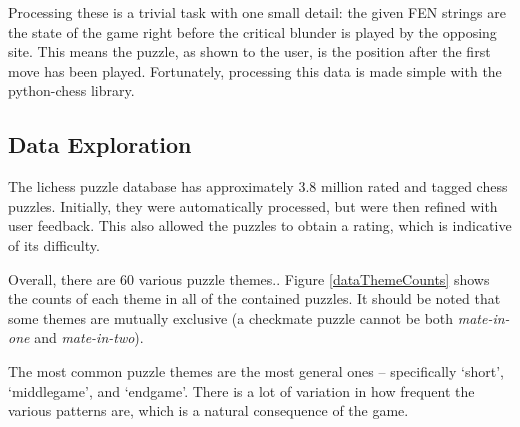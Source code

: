 Processing these is a trivial task with one small detail: the given FEN strings
are the state of the game right before the critical blunder is played by the
opposing site. This means the puzzle, as shown to the user, is the position
after the first move has been played. Fortunately, processing this data is made
simple with the python-chess library.\cite{pythonChess}

\subsection{Data Exploration}

The lichess puzzle database has approximately 3.8 million rated and tagged
chess puzzles. Initially, they were automatically
processed,\cite{lichessTagger} but were then refined with user
feedback\cite{lichessPuzzles}. This also allowed the puzzles to obtain a
rating, which is indicative of its difficulty\cite{lichessPuzzles}.

Overall, there are 60 various puzzle themes.\cite{lichessXML}. Figure
\ref{dataThemeCounts} shows the counts of each theme in all of the contained
puzzles. It should be noted that some themes are mutually exclusive (a
checkmate puzzle cannot be both \emph{mate-in-one} and \emph{mate-in-two}).

The most common puzzle themes are the most general ones -- specifically
`short', `middlegame', and `endgame'. There is a lot of variation in how
frequent the various patterns are, which is a natural consequence of the game.

